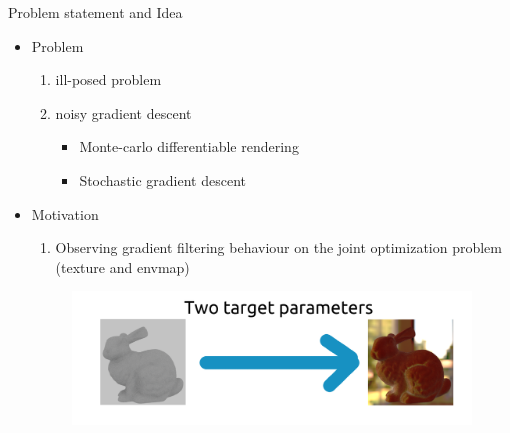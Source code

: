 \documentclass[beamer]{standalone}
\begin{document}
\begin{frame}{Problem statement and Idea}
    \begin{itemize}
        \setlength\itemsep{1em}

        \item Problem 
        \begin{enumerate}
            \item ill-posed problem
            \item noisy gradient descent
            \begin{itemize}
                \item Monte-carlo differentiable rendering
                \item Stochastic gradient descent
            \end{itemize}
        \end{enumerate}
        \item Motivation
        \begin{enumerate}
            \item Observing gradient filtering behaviour on the joint optimization problem \\ 
            (texture and envmap)
        \end{enumerate}
        \begin{figure}
            \includegraphics{./figures/Intro-1.png}
        \end{figure}
    \end{itemize}
\end{frame}
\end{document}
